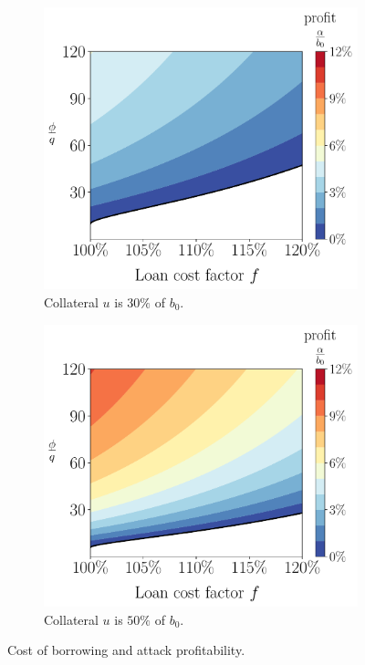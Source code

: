 \begin{figure}[htb]
  \centering
  \begin{subfigure}{0.49\textwidth}
    \includegraphics[width=\textwidth]{./figures/plotf30.pdf}
    \caption{Collateral $u$ is $30\%$ of $b_0$.}
    \label{fig:plotf30}
  \end{subfigure}
  \hfill
  \begin{subfigure}{0.49\textwidth}
    \includegraphics[width=\textwidth]{./figures/plotf50.pdf}
    \caption{Collateral $u$ is $50\%$ of $b_0$.}
    \label{fig:plotf50}
  \end{subfigure}
  \caption{Cost of borrowing and attack profitability.}
  \label{fig:plotf}
\end{figure}

